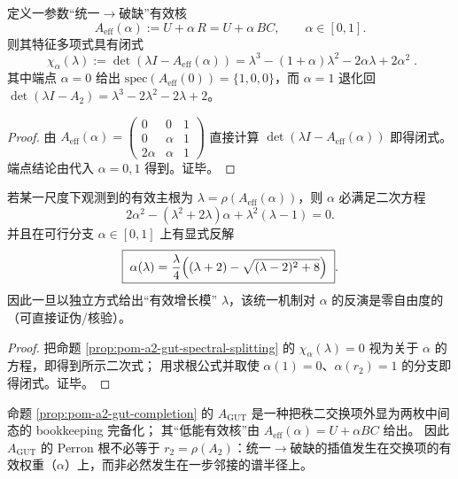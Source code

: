 \begin{proposition}[统一$\to$破缺插值与谱分裂三次族]\label{prop:pom-a2-gut-spectral-splitting}
定义一参数“统一$\to$破缺”有效核
\[
A_{\mathrm{eff}}(\alpha):=U+\alpha\,R=U+\alpha\,BC,\qquad \alpha\in[0,1].
\]
则其特征多项式具有闭式
\[
\boxed{\;
\chi_\alpha(\lambda)
:=\det(\lambda I-A_{\mathrm{eff}}(\alpha))
=
\lambda^3-(1+\alpha)\lambda^2-2\alpha\lambda+2\alpha^2\; }.
\]
其中端点 \(\alpha=0\) 给出 \(\mathrm{spec}(A_{\mathrm{eff}}(0))=\{1,0,0\}\)，而 \(\alpha=1\) 退化回
\(\det(\lambda I-A_2)=\lambda^3-2\lambda^2-2\lambda+2\)。
\end{proposition}
\begin{proof}
由
\(
A_{\mathrm{eff}}(\alpha)=\begin{pmatrix}0&0&1\\0&\alpha&1\\2\alpha&\alpha&1\end{pmatrix}
\)
直接计算 \(\det(\lambda I-A_{\mathrm{eff}}(\alpha))\) 即得闭式。
端点结论由代入 \(\alpha=0,1\) 得到。证毕。
\end{proof}

\begin{corollary}\label{cor:pom-a2-gut-invert-alpha}
若某一尺度下观测到的有效主根为 \(\lambda=\rho(A_{\mathrm{eff}}(\alpha))\)，则 \(\alpha\) 必满足二次方程
\[
2\alpha^2-(\lambda^2+2\lambda)\alpha+\lambda^2(\lambda-1)=0.
\]
并且在可行分支 \(\alpha\in[0,1]\) 上有显式反解
\[
\boxed{\;
\alpha(\lambda)=\frac{\lambda}{4}\Bigl((\lambda+2)-\sqrt{(\lambda-2)^2+8}\Bigr)\; }.
\]
因此一旦以独立方式给出“有效增长模” \(\lambda\)，该统一机制对 \(\alpha\) 的反演是零自由度的（可直接证伪/核验）。
\end{corollary}
\begin{proof}
把命题 \ref{prop:pom-a2-gut-spectral-splitting} 的 \(\chi_\alpha(\lambda)=0\) 视为关于 \(\alpha\) 的方程，即得到所示二次式；
用求根公式并取使 \(\alpha(1)=0\)、\(\alpha(r_2)=1\) 的分支即得闭式。证毕。
\end{proof}

\begin{remark}[“母核”与一步谱半径的区分]\label{rem:pom-a2-gut-mother-vs-effective}
命题 \ref{prop:pom-a2-gut-completion} 的 \(A_{\mathrm{GUT}}\) 是一种把秩二交换项外显为两枚中间态的 bookkeeping 完备化；
其“低能有效核”由 \(A_{\mathrm{eff}}(\alpha)=U+\alpha BC\) 给出。
因此 \(A_{\mathrm{GUT}}\) 的 Perron 根不必等于 \(r_2=\rho(A_2)\)：统一$\to$破缺的插值发生在交换项的有效权重（\(\alpha\)）上，而非必然发生在一步邻接的谱半径上。
\end{remark}

